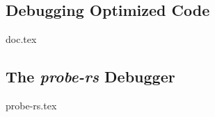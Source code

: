 


\subsection{Debugging Optimized Code}
{doc.tex}


\subsection{The \emph{probe-rs} Debugger}
{probe-rs.tex}


%
%
%
%
%

